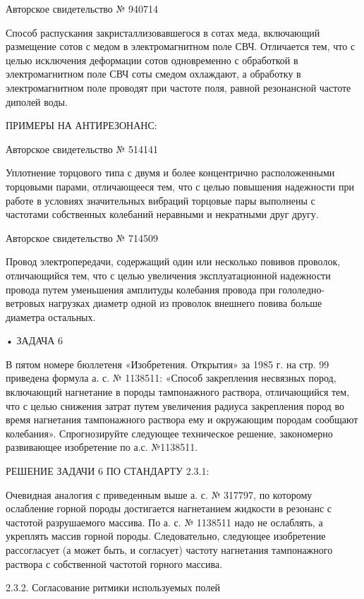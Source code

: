 Авторское свидетельство № 940714

Способ  распускания закристаллизовавшегося  в  сотах меда,  включающий
размещение сотов с медом в  электромагнитном поле СВЧ. Отличается тем,
что с  целью исключения деформации  сотов одновременно с  обработкой в
электромагнитном  поле  СВЧ  соты  смедом  охлаждают,  а  обработку  в
электромагнитном поле  проводят при  частоте поля,  равной резонансной
частоте диполей воды.


ПРИМЕРЫ НА АНТИРЕЗОНАНС:


Авторское свидетельство № 514141

Уплотнение торцового типа с  двумя и более концентрично расположенными
торцовыми парами,  отличающееся тем, что с  целью повышения надежности
при работе в условиях значительных  вибраций торцовые пары выполнены с
частотами собственных колебаний неравными и некратными друг другу.


Авторское свидетельство № 714509

Провод   электропередачи,  содержащий   один  или   несколько  повивов
проволок, отличающийся  тем, что  с целью  увеличения эксплуатационной
надежности провода  путем уменьшения  амплитуды колебания  провода при
гололедно-ветровых нагрузках диаметр одной из проволок внешнего повива
больше диаметра остальных.


• ЗАДАЧА 6

В  пятом  номере  бюллетеня  «Изобретения. Открытия»  за  1985  г.  на
стр.  99  приведена  формула  а. с.  №  1138511:  «Способ  закрепления
несвязных пород, включающий нагнетание в породы тампонажного раствора,
отличающийся тем, что с целью снижения затрат путем увеличения радиуса
закрепления  пород  во  время  нагнетания  тампонажного  раствора  ему
и  окружающим породам  сообщают  колебания». Спрогнозируйте  следующее
техническое  решение,  закономерно  развивающее  изобретение  по  а.с.
№1138511.


РЕШЕНИЕ ЗАДАЧИ 6 ПО СТАНДАРТУ 2.3.1:

Очевидная  аналогия с  приведенным выше  а. с.  № 317797,  по которому
ослабление горной породы достигается нагнетанием жидкости в резонанс с
частотой разрушаемого массива. По а. с. № 1138511 надо не ослаблять, а
укреплять массив  горной породы. Следовательно,  следующее изобретение
рассогласует   (а  может   быть,  и   согласует)  частоту   нагнетания
тампонажного раствора с собственной частотой горного массива.

2.3.2. Согласование ритмики используемых полей

